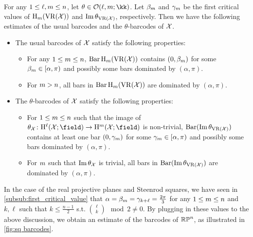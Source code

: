 For any $1 \leq \ell, m \leq n$, let $\theta \in \cO(\ell, \degp; \kk)$. 
Let $\beta_m$ and $\gamma_m$ be the first critical values of $\mathrm{H}_m(\operatorname{VR}(\mathcal{X}))$ and $\operatorname{Im} \theta_{\operatorname{VR}(\mathcal{X})}$, respectively.
Then we have the following estimates of the usual barcodes and the $\theta$-barcodes of $\mathcal{X}$. 
\begin{itemize}
    \item The usual barcodes of $\mathcal{X}$ satisfy the following properties:
        \begin{itemize}
            \item For any $1 \leq m \leq n$, $\Hbarc[\field]{\degp}{\cX}$ contains $(0,\beta_m )$ for some $\beta_m \in [\alpha, \pi)$ and possibly some bars dominated by $(\alpha, \pi)$.
            \item For $m > n$, all bars in $\Hbarc[\field]{\degp}{\cX}$ are dominated by $(\alpha, \pi)$.
        \end{itemize}
    \item The $\theta$-barcodes of $\mathcal{X}$ satisfy the following properties: 
        \begin{itemize}
            \item For $1 \leq m \leq n$ such that the image of $\theta_\cX \colon \rH^\ell(\cX; \field) \to \rH^\degp(\cX; \field)$ is non-trivial, $\operatorname{Bar}(\operatorname{Im} \theta_{\operatorname{VR}(\mathcal{X})})$ contains at least one bar $(0,\gamma_m )$ for some $\gamma_m \in [\alpha, \pi)$ and possibly some bars dominated by $(\alpha, \pi)$. 
            \item For $m$ such that $\operatorname{Im} \theta_{\mathcal{X}}$ is trivial, all bars in $\operatorname{Bar}(\operatorname{Im} \theta_{\operatorname{VR}(\mathcal{X})})$ are dominated by $(\alpha, \pi)$. 
        \end{itemize}
\end{itemize}

\example 
In the case of the real projective planes and Steenrod squares, we have seen in \cref{subsub:first_critical_value} that $\alpha = \beta_m = \gamma_{k+\ell} = \tfrac{2\pi}{3}$ for any $1 \leq m \leq n$ and $k, \ell$ such that $k \leq \frac{n-1}{2}$ s.t. $\binom{\ell}{k} \mod 2\neq 0$. 
By plugging in these values to the above discussion, we obtain an estimate of the barcodes of $\mathbb{RP}^n$, as illustrated in \cref{fig:sq barcodes}.


